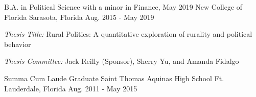 

\begin{cventries}

  \cventry
    {B.A. in Political Science with a minor in Finance, May 2019} %
    {New College of Florida} %
    {Sarasota, Florida} %
    {Aug. 2015 - May 2019} %
    {
    \begin{cvitems}
      \item \emph{Thesis Title:} Rural Politics: A quantitative exploration of rurality and political behavior
      \item \emph{Thesis Committee:} Jack Reilly (Sponsor), Sherry Yu, and Amanda Fidalgo
    \end{cvitems}
  }


  \cventry
    {Summa Cum Laude Graduate} %
    {Saint Thomas Aquinas High School} %
    {Ft. Lauderdale, Florida} %
    {Aug. 2011 - May 2015} %
    {}

\vspace{-.25cm}




\end{cventries}
